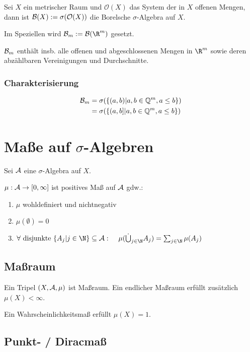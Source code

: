 Sei $X$ ein metrischer Raum und $\mathcal{O}(X)$ das System der in $X$ offenen Mengen, dann ist $\mathcal{B}(X) := \sigma(\mathcal{O}(X))$ die Borelsche $\sigma$-Algebra auf $X$.

Im Speziellen wird $\B_m := \B(\R^m)$ gesetzt.

$\mathcal{B}_m$ enthält insb. alle offenen und abgeschlossenen Mengen in $\R^m$ sowie deren abzählbaren Vereinigungen und Durchschnitte.

\subsubsection*{Charakterisierung}

\vspace*{-4mm}
\begin{align*}
	\mathcal{B}_m &= \sigma(\{(a, b) | a, b \in \mathbb{Q}^m, a \leq b\}) \\
	              &= \sigma(\{(a, b] | a, b \in \mathbb{Q}^m, a \leq b\})
\end{align*}

\section*{Maße auf $\sigma$-Algebren}

Sei $\mathcal{A}$ eine $\sigma$-Algebra auf $X$.

$\mu : \mathcal{A} \to [0, \infty]$ ist positives Maß auf $\mathcal{A}$ gdw.:

\begin{enumerate}[label=(\alph*)]
	\item $\mu$ wohldefiniert und nichtnegativ
	\item $\mu(\emptyset) = 0$
	\item $\forall \text{ disjunkte } \{A_j | j \in \N\} \subseteq \A :\\ \hspace*{4mm} \mu(\dot\bigcup_{j\in \N} A_j) = \sum_{j\in \N} \mu(A_j)$
\end{enumerate}

\subsection*{Maßraum}

Ein Tripel $(X, \mathcal{A}, \mu)$ ist Maßraum. Ein endlicher Maßraum erfüllt zusätzlich $\mu(X) < \infty$.

Ein Wahrscheinlichkeitsmaß erfüllt $\mu(X) = 1$.

\subsection*{Punkt- / Diracmaß}

